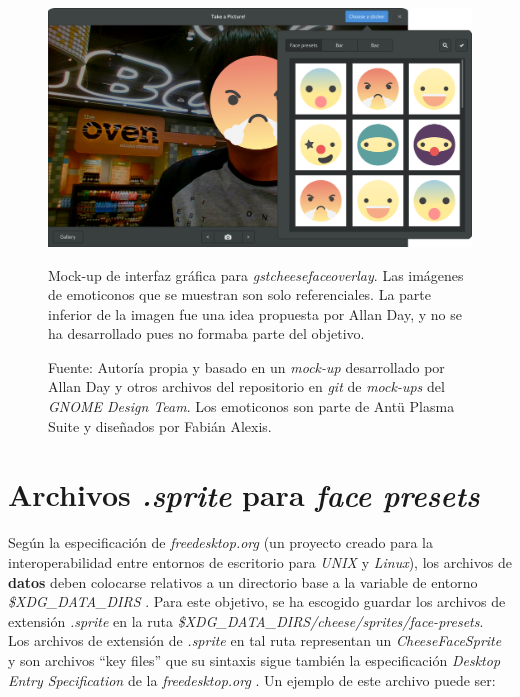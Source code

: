 \documentclass[a4paper,openright,12pt]{report}
\begin{document}
\begin{figure}[!h]
  \centering
    \includegraphics[width=1.0\textwidth]{../images/cheese-mockup.png}\par
  \caption{Mock-up de interfaz gráfica para \textit{gstcheesefaceoverlay}. Las
    imágenes de emoticonos que se muestran son solo referenciales. La parte
    inferior de la imagen fue una idea propuesta por Allan Day, y no se ha
    desarrollado pues no formaba parte del objetivo.}
    \label{fig:cheese-mockup}
  \caption*{Fuente: Autoría propia y basado en un \textit{mock-up} desarrollado
    por Allan Day y otros archivos del repositorio en \textit{git} de
    \textit{mock-ups} del \textit{GNOME Design Team}. Los emoticonos son parte
    de Antü Plasma Suite y diseñados por Fabián Alexis.}
\end{figure}

\section{Archivos \textit{.sprite} para \textit{face presets}}
Según la especificación de \textit{freedesktop.org} (un proyecto creado para la
interoperabilidad entre entornos de escritorio para \textit{UNIX} y
\textit{Linux}), los archivos de \textbf{datos} deben colocarse relativos a un
directorio base a la variable de entorno \textit{\$XDG\_DATA\_DIRS}
\cite{freedesktopXDGBase}. Para este objetivo, se ha escogido guardar los
archivos de extensión \textit{.sprite} en la ruta
\textit{\$XDG\_DATA\_DIRS/cheese/sprites/face-presets}.\\

Los archivos de extensión de \textit{.sprite} en tal ruta representan un
\textit{CheeseFaceSprite} y son archivos ``key files'' que su sintaxis sigue
también la especificación \textit{Desktop Entry Specification} de la
\textit{freedesktop.org} \cite{freedesktopDesktopEntrySpec}. Un ejemplo de este
archivo puede ser:\\
\end{document}
